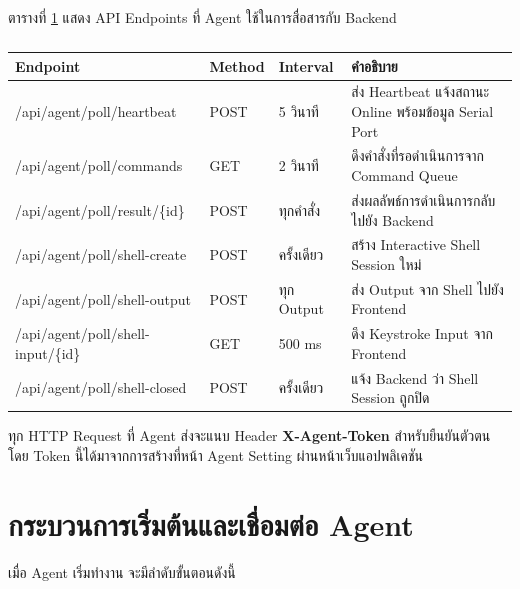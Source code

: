 \hspace*{1.3em}
ตารางที่ \ref{tabD2:PollingEndpoints} แสดง API Endpoints ที่ Agent ใช้ในการสื่อสารกับ Backend

\begin{table}[H]
\centering
\caption{}
\label{tabD2:PollingEndpoints}
\fontSixTeen
\begin{tabularx}{\textwidth}{|l|l|l|X|}
\hline
\textbf{Endpoint} & \textbf{Method} & \textbf{Interval} & \textbf{คำอธิบาย} \\
\hline
/api/agent/poll/heartbeat & POST & 5 วินาที & ส่ง Heartbeat แจ้งสถานะ Online พร้อมข้อมูล Serial Port \\
\hline
/api/agent/poll/commands & GET & 2 วินาที & ดึงคำสั่งที่รอดำเนินการจาก Command Queue \\
\hline
/api/agent/poll/result/\{id\} & POST & ทุกคำสั่ง & ส่งผลลัพธ์การดำเนินการกลับไปยัง Backend \\
\hline
/api/agent/poll/shell-create & POST & ครั้งเดียว & สร้าง Interactive Shell Session ใหม่ \\
\hline
/api/agent/poll/shell-output & POST & ทุก Output & ส่ง Output จาก Shell ไปยัง Frontend \\
\hline
/api/agent/poll/shell-input/\{id\} & GET & 500 ms & ดึง Keystroke Input จาก Frontend \\
\hline
/api/agent/poll/shell-closed & POST & ครั้งเดียว & แจ้ง Backend ว่า Shell Session ถูกปิด \\
\hline
\end{tabularx}
\end{table}

\hspace*{1.3em}
ทุก HTTP Request ที่ Agent ส่งจะแนบ Header \textbf{X-Agent-Token} สำหรับยืนยันตัวตน โดย Token นี้ได้มาจากการสร้างที่หน้า Agent Setting ผ่านหน้าเว็บแอปพลิเคชัน

\section{กระบวนการเริ่มต้นและเชื่อมต่อ Agent}
\hspace*{1.3em}
เมื่อ Agent เริ่มทำงาน จะมีลำดับขั้นตอนดังนี้


